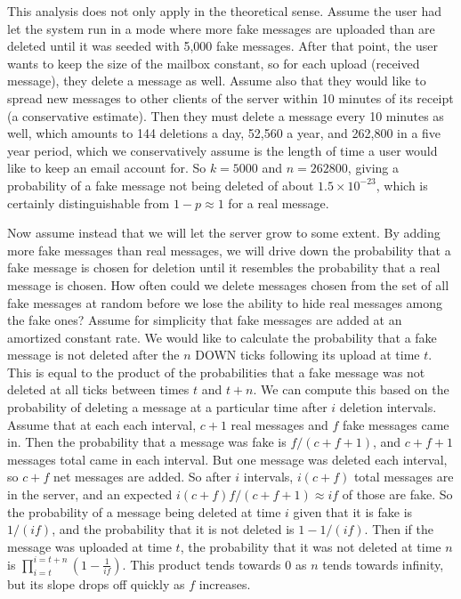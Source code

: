 \documentclass[pageno]{jpaper}
\begin{document}
This analysis does not only apply in the theoretical sense. Assume the user had let the system run in a mode where more fake messages are uploaded than are deleted until it was seeded with 5,000 fake messages. After that point, the user wants to keep the size of the mailbox constant, so for each upload (received message), they delete a message as well. Assume also that they would like to spread new messages to other clients of the server within 10 minutes of its receipt (a conservative estimate). Then they must delete a message every 10 minutes as well, which amounts to 144 deletions a day, 52,560 a year, and 262,800 in a five year period, which we conservatively assume is the length of time a user would like to keep an email account for. So $k=5000$ and $n=262800$, giving a probability of a fake message not being deleted of about $1.5\times10^{-23}$, which is certainly distinguishable from $1-p \approx 1$ for a real message.

Now assume instead that we will let the server grow to some extent. By adding more fake messages than real messages, we will drive down the probability that a fake message is chosen for deletion until it resembles the probability that a real message is chosen. How often could we delete messages chosen from the set of all fake messages at random before we lose the ability to hide real messages among the fake ones? Assume for simplicity that fake messages are added at an amortized constant rate. We would like to calculate the probability that a fake message is not deleted after the $n$ DOWN ticks following its upload at time $t$. This is equal to the product of the probabilities that a fake message was not deleted at all ticks between times $t$ and $t+n$. We can compute this based on the probability of deleting a message at a particular time after $i$ deletion intervals. Assume that at each each interval, $c+1$ real messages and $f$ fake messages came in. Then the probability that a message was fake is $f/(c+f+1)$, and $c+f+1$ messages total came in each interval. But one message was deleted each interval, so $c+f$ net messages are added. So after $i$ intervals, $i(c+f)$ total messages are in the server, and an expected $i(c+f)f/(c+f+1)\approx if$ of those are fake. So the probability of a message being deleted at time $i$ given that it is fake is $1/(if)$, and the probability that it is not deleted is $1-1/(if)$. Then if the message was uploaded at time $t$, the probability that it was not deleted at time $n$ is $\displaystyle\prod_{i=t}^{i=t+n}(1-\frac{1}{if})$. This product tends towards 0 as $n$ tends towards infinity, but its slope drops off quickly as $f$ increases.
\end{document}
